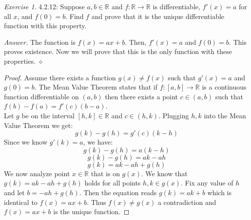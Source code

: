 \documentclass[12pt,oneside]{amsart}
\theoremstyle{definition}
\theoremstyle{remark}
\newtheorem{exer}{Exercise}
\numberwithin{equation}{exer}
\newenvironment{answer}{\bigskip\noindent\emph{Answer.}}{\hfill$\diamond$\newline}
\begin{document}
\newpage
\begin{exer}
4.2.12: Suppose $a,b \in \mathbb{R}$ and $f:\mathbb{R} \rightarrow \mathbb{R}$ is differentiable, $f'(x)=a$ for all $x$, and $f(0)=b$. Find $f$ and prove that it is the unique differentiable function with this property.
\end{exer}
\begin{answer}
The function is $f(x)=ax+b$. Then, $f'(x)=a$ and $f(0)=b$. This proves existence. Now we will prove that this is the only function with these properties.
\end{answer}
\begin{proof}
Assume there exists a function $g(x) \neq f(x)$ such that $g'(x)=a$ and $g(0)=b$. The Mean Value Theorem states that if $f:[a,b]\rightarrow \mathbb{R}$ is a continuous function differentiable on $(a,b)$ then there exists a point $c\in (a,b)$ such that $f(b)-f(a)=f'(c)(b-a)$. \\
Let $g$ be on the interval $[h,k] \in \mathbb{R}$ and $c\in (h,k)$. Plugging $h,k$ into the Mean Value Theorem we get:
$$g(k)-g(h)=g'(c)(k-h)$$
Since we know $g'(k)=a$, we have:
$$g(k)-g(h)=a(k-h)$$
$$g(k)-g(h)=ak-ah$$
$$g(k)=ak-ah+g(h)$$
We now analyze point $x\in \mathbb{R}$ that is on $g(x)$. We know that $g(k)=ak-ah+g(h)$ holds for all points $h,k \in g(x)$. Fix any value of $h$ and let $b=-ah+g(h)$. Then the equation reads $g(k)=ak+b$ which is identical to $f(x)=ax+b$.  Thus $f(x)\neq g(x)$ a contradiction and $f(x)=ax+b$ is the unique function.

\begin{comment}
We now analyze three cases: \\
(1) If $x<0$, then we have the interval $(x,0)$. Plugging this into the above formula we have:
$$g(x)-g(0)=g'(x)(x-0)$$
$$g(x)-b=a(x-0)$$
$$g(x)=ax+b$$
(2) If $x=0$, then we have the point $(0,0)$. Note that this point can be rewritten in the form $0=0(a)+b$ where $b$ is 0. \\
(3) If $x>0$, then we have the interval $(0,x)$. Plugging this into the above formula we have:
$$g(0)-g(x)=g'(x)(0-x)$$
$$b-g(x)=-ax$$
$$g(x)=ax+b$$
Thus, no matter the value of $x$, $g(x)$ is in the form $ax+b$. Thus $f(x)\neq g(x)$ a contradiction and $f(x)=ax+b$ is the unique function.
\end{comment}


\end{proof}
\end{document}
